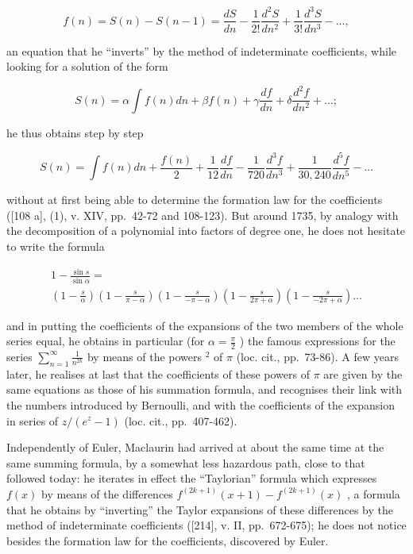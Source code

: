 \[
f (n) = S (n) - S (n - 1) = \frac {d S}{d n} - \frac {1}{2 !} \frac {d ^ {2} S}{d n ^ {2}} + \frac {1}{3 !} \frac {d ^ {3} S}{d n ^ {3}} - \dots ,
\]

an equation that he ``inverts'' by the method of indeterminate coefficients, while looking for a solution of the form

\[
S (n) = \alpha \int f (n) d n + \beta f (n) + \gamma \frac {d f}{d n} + \delta \frac {d ^ {2} f}{d n ^ {2}} + \dots ;
\]

he thus obtains step by step

\[
S (n) = \int f (n) d n + \frac {f (n)}{2} + \frac {1}{12} \frac {d f}{d n} - \frac {1}{720} \frac {d ^ {3} f}{d n ^ {3}} + \frac {1}{30,240} \frac {d ^ {5} f}{d n ^ {5}} - \dots
\]

without at first being able to determine the formation law for the coefficients ({[}108 a{]}, (1), v. XIV, pp.~42-72 and 108-123). But around 1735, by analogy with the decomposition of a polynomial into factors of degree one, he does not hesitate to write the formula

\[
\begin{array}{c} 1 - \frac {\sin s}{\sin \alpha} = \\ \left(1 - \frac {s}{\alpha}\right) \left(1 - \frac {s}{\pi - \alpha}\right) \left(1 - \frac {s}{- \pi - \alpha}\right) \left(1 - \frac {s}{2 \pi + \alpha}\right) \left(1 - \frac {s}{- 2 \pi + \alpha}\right) \dots \end{array}
\]

and in putting the coefficients of the expansions of the two members of the whole series equal, he obtains in particular (for \(\alpha = \frac{\pi}{2}\) ) the famous expressions for the series \(\sum_{n=1}^{\infty} \frac{1}{n^{2k}}\) by means of the powers \(^2\) of \(\pi\) (loc. cit., pp.~73-86). A few years later, he realises at last that the coefficients of these powers of \(\pi\) are given by the same equations as those of his summation formula, and recognises their link with the numbers introduced by Bernoulli, and with the coefficients of the expansion in series of \(z/(e^z - 1)\) (loc. cit., pp.~407-462).

Independently of Euler, Maclaurin had arrived at about the same time at the same summing formula, by a somewhat less hazardous path, close to that followed today: he iterates in effect the ``Taylorian'' formula which expresses \(f(x)\) by means of the differences \(f^{(2k + 1)}(x + 1) - f^{(2k + 1)}(x)\) , a formula that he obtains by ``inverting'' the Taylor expansions of these differences by the method of indeterminate coefficients ({[}214{]}, v. II, pp.~672-675); he does not notice besides the formation law for the coefficients, discovered by Euler.

